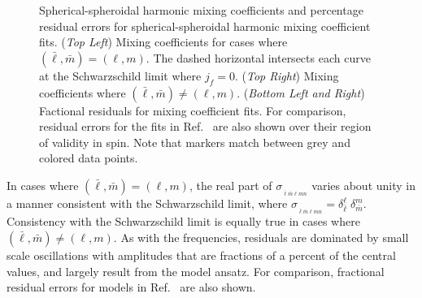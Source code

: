 \documentclass[twocolumn,aps,prd,floatfix,preprintnumbers,a4paper,nofootinbib,
superscriptaddress,10pt]{revtex4-1}
\def\jf{j_f}
\def\LMlmn{_{\bar{\ell} \bar{m} \ell m n}}
\begin{document}
\begin{figure}[htb]
\begin{tabular}{ll}
  \end{tabular}
	\caption{ Spherical-spheroidal harmonic mixing coefficients and percentage residual errors for spherical-spheroidal harmonic mixing coefficient fits. (\textit{Top Left}) Mixing coefficients for cases where $(\bar{\ell},\bar{m})=(\ell,m)$. The dashed horizontal intersects each curve at the Schwarzschild limit where $\jf=0$. (\textit{Top Right}) Mixing coefficients where $(\bar{\ell},\bar{m})\neq(\ell,m)$. (\textit{Bottom Left and Right}) Factional residuals for mixing coefficient fits. For comparison, residual errors for the fits in Ref.~\cite{Berti:2014fga} are also shown over their region of validity in \bh{} spin. Note that markers match between grey and colored data points. }
  \label{fig:ys}
\end{figure}
%
In cases where $(\bar\ell,\bar{m})=(\ell,m)$, the real part of $\sigma_{\LMlmn}$ varies about unity in a manner consistent with the Schwarzschild limit, where $\sigma_{\LMlmn}=\delta_{\bar\ell}^{\ell}\;\delta_{\bar{m}}^{m}$.
%
Consistency with the Schwarzschild limit is equally true in cases where $(\bar\ell,\bar{m}) \neq (\ell,m)$.
%
As with the \qnm{} frequencies, residuals are dominated by small scale oscillations with amplitudes that are fractions of a percent of the central values, and largely result from the model ansatz.
%
For comparison, fractional residual errors for models in Ref.~\cite{Berti:2014fga} are also shown.
%
\end{document}
